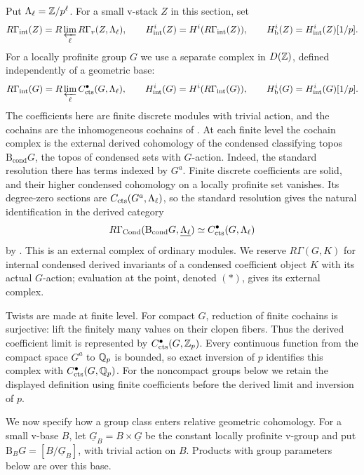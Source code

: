 Put $\Lambda_\ell=\mathbb Z/p^\ell$.  For a small v-stack $Z$ in this section, set
\[
 R\Gamma_{\mathrm{int}}(Z)
   =R\varprojlim_{\ell}R\Gamma_v(Z,\Lambda_\ell),\qquad
 H^i_{\mathrm{int}}(Z)=H^i(R\Gamma_{\mathrm{int}}(Z)),
 \qquad H^i_{\mathrm b}(Z)=H^i_{\mathrm{int}}(Z)[1/p].
\]
For a locally profinite group $G$ we use a separate complex in $D(\mathbb Z)$,
defined independently of a geometric base:
\[
 R\Gamma_{\mathrm{int}}(G)
    =R\varprojlim_\ell C^\bullet_{\mathrm{cts}}(G,\Lambda_\ell),
 \qquad H^i_{\mathrm{int}}(G)=H^i(R\Gamma_{\mathrm{int}}(G)),
 \qquad H^i_{\mathrm b}(G)=H^i_{\mathrm{int}}(G)[1/p].
\]
The coefficients here are finite discrete modules with trivial action,
and the cochains are the inhomogeneous cochains of
.  At each finite level the cochain complex is the
external derived cohomology of the condensed classifying topos
$\mathrm B_{\mathrm{cond}}G$, the topos of condensed sets with $G$-action.
Indeed, the standard resolution there has terms indexed by $G^a$.
Finite discrete coefficients are solid, and their higher condensed
cohomology on a locally profinite set vanishes.  Its degree-zero
sections are $C_{\mathrm{cts}}(G^a,\Lambda_\ell)$, so the standard
resolution gives the natural identification in the derived category
\[
 R\Gamma_{\mathrm{Cond}}
   (\mathrm B_{\mathrm{cond}}G,\underline{\Lambda_\ell})
       \simeq C^\bullet_{\mathrm{cts}}(G,\Lambda_\ell)
\]
by \cite[Section~2, standard resolution and Lemmas~2.1--2.2,
pp.~5--7]{AnschuetzSolidGroupCohomology}.  This is an external complex
of ordinary modules.  We reserve $R\Gamma(G,K)$ for internal condensed
derived invariants of a condensed coefficient object $K$ with its
actual $G$-action; evaluation at the point, denoted $(*)$, gives its
external complex.

Twists are made at finite level.  For compact $G$, reduction of finite
cochains is surjective: lift the finitely many values on their clopen
fibers.  Thus the derived coefficient limit is represented by
$C^\bullet_{\mathrm{cts}}(G,\mathbb Z_p)$.  Every continuous function from the
compact space $G^a$ to $\mathbb Q_p$ is bounded, so exact inversion of $p$
identifies this complex with $C^\bullet_{\mathrm{cts}}(G,\mathbb Q_p)$.
For the noncompact groups below we retain the displayed definition
using finite coefficients before the derived limit and inversion of $p$.

We now specify how a group class enters relative geometric cohomology.
For a small v-base $B$, let $\underline G_B=B\times\underline G$ be
the constant locally profinite v-group and put
$\mathrm B_B G=[B/\underline G_B]$, with trivial action on $B$.
Products with group parameters below are over this base.

